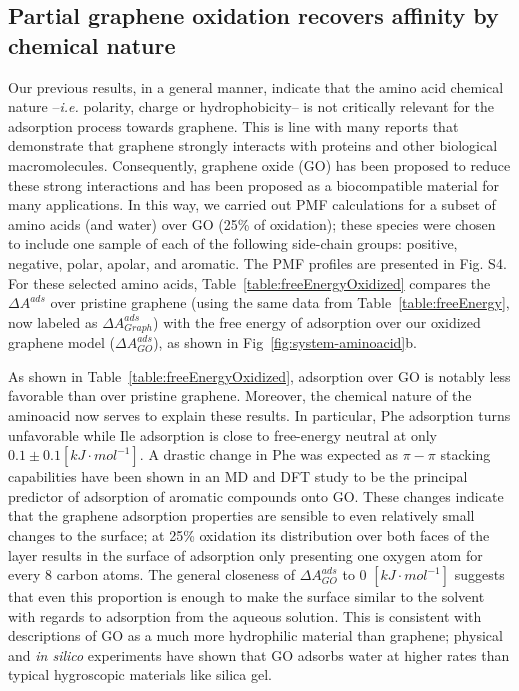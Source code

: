 \documentclass[journal=jcisd8,manuscript=article,layout=twocolumn]{achemso}
\begin{document}
\subsection{Partial graphene oxidation recovers affinity by chemical nature}

Our previous results, in a general manner, indicate that the amino acid chemical nature --\emph{i.e.} polarity, charge or hydrophobicity-- is not critically relevant for the adsorption process towards graphene.
This is line with many reports that demonstrate that graphene strongly interacts with proteins and other biological macromolecules.\cite{Zhang2013,Chong2015,Puigpelat_2019,Duan_2015,Zhou2014,Lalwani_2016}
Consequently, graphene oxide (GO) has been proposed to reduce these strong interactions and has been proposed as a biocompatible material for many applications.\cite{Gomez-Navarro2010,Rhazouani2021}
In this way, we carried out PMF calculations for a subset of amino acids (and water) over GO (25\% of oxidation); these species were chosen to include one sample of each of the following side-chain groups: positive, negative, polar, apolar, and aromatic.
The PMF profiles are presented in Fig. S4.
For these selected amino acids, Table~\ref{table:freeEnergyOxidized} compares the $\Delta A^{ads}$ over pristine graphene (using the same data from Table~\ref{table:freeEnergy}, now labeled as $\Delta A^{ads}_{Graph}$) with the free energy of adsorption over our oxidized graphene model ($\Delta A^{ads}_{GO}$), as shown in Fig~\ref{fig:system-aminoacid}b.

As shown in Table~\ref{table:freeEnergyOxidized}, adsorption over GO is notably less favorable than over pristine graphene.
Moreover, the chemical nature of the aminoacid now serves to explain these results.
In particular, Phe adsorption turns unfavorable while Ile adsorption is close to free-energy neutral at only $0.1 \pm 0.1 [kJ\cdot mol^{-1}]$.
A drastic change in Phe was expected as $\pi-\pi$ stacking capabilities have been shown in an MD and DFT study to be the principal predictor of adsorption of aromatic compounds onto GO.\cite{Tang_2018}
These changes indicate that the graphene adsorption properties are sensible to even relatively small changes to the surface; at 25\% oxidation its distribution over both faces of the layer results in the surface of adsorption only presenting one oxygen atom for every 8 carbon atoms.
The general closeness of $\Delta A^{ads}_{GO}$ to 0 $[kJ \cdot mol^{-1}]$ suggests that even this proportion is enough to make the surface similar to the solvent with regards to adsorption from the aqueous solution.
This is consistent with descriptions of GO as a much more hydrophilic material than graphene; physical and \textit{in silico} experiments have shown that GO adsorbs water at higher rates than typical hygroscopic materials like silica gel.\cite{Lian_2018}
\end{document}
